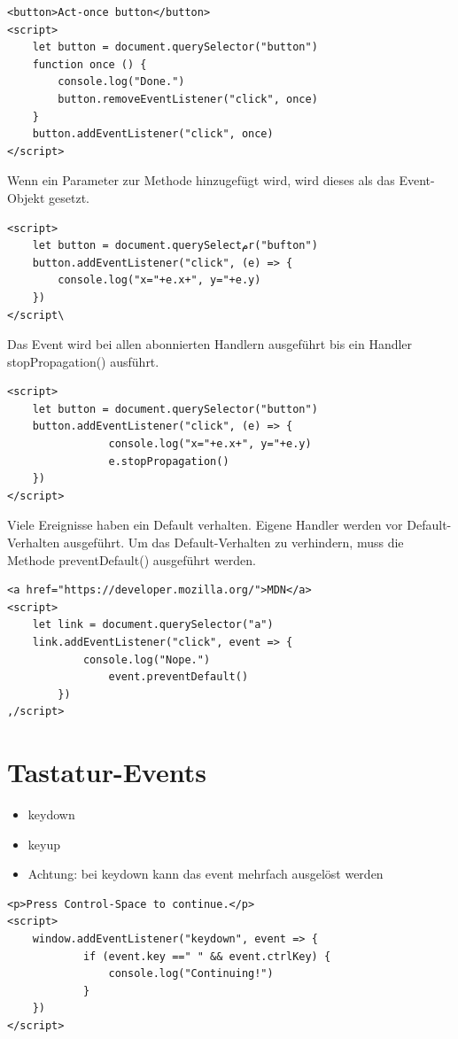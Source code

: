 \documentclass[10pt]{article}
\begin{document}
\begin{verbatim}
<button>Act-once button</button>
<script>
    let button = document.querySelector("button")
    function once () {
        console.log("Done.")
        button.removeEventListener("click", once)
    }
    button.addEventListener("click", once)
</script>
\end{verbatim}

Wenn ein Parameter zur Methode hinzugefügt wird, wird dieses als das Event-Objekt gesetzt.

\begin{verbatim}
<script>
    let button = document.querySelectمr("bufton")
    button.addEventListener("click", (e) => {
        console.log("x="+e.x+", y="+e.y)
    })
</script\
\end{verbatim}

Das Event wird bei allen abonnierten Handlern ausgeführt bis ein Handler stopPropagation() ausführt.

\begin{verbatim}
<script>
    let button = document.querySelector("button")
    button.addEventListener("click", (e) => {
                console.log("x="+e.x+", y="+e.y)
                e.stopPropagation()
    })
</script>
\end{verbatim}

Viele Ereignisse haben ein Default verhalten. Eigene Handler werden vor Default-Verhalten ausgeführt. Um das Default-Verhalten zu verhindern, muss die Methode preventDefault() ausgeführt werden.

\begin{verbatim}
<a href="https://developer.mozilla.org/">MDN</a>
<script>
    let link = document.querySelector("a")
    link.addEventListener("click", event => {
            console.log("Nope.")
                event.preventDefault()
        })
,/script>
\end{verbatim}

\section*{Tastatur-Events}
\begin{itemize}
  \item keydown
  \item keyup
  \item Achtung: bei keydown kann das event mehrfach ausgelöst werden
\end{itemize}

\begin{verbatim}
<p>Press Control-Space to continue.</p>
<script>
    window.addEventListener("keydown", event => {
            if (event.key ==" " && event.ctrlKey) {
                console.log("Continuing!")
            }
    })
</script>
\end{verbatim}
\end{document}
